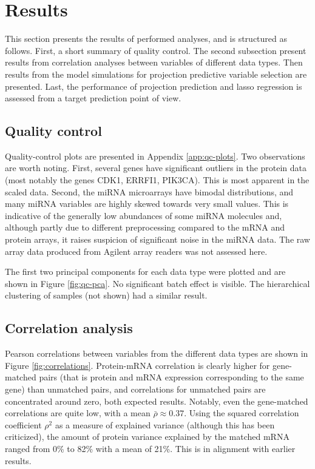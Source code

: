 
\section{Results}

This section presents the results of performed analyses, and is structured as
follows. First, a short summary of quality control. The second subsection
present results from correlation analyses between variables of different data
types. Then results from the model simulations for projection predictive
variable selection are presented. Last, the performance of projection
prediction and lasso regression is assessed from a target prediction point of
view.




\subsection{Quality control}

Quality-control plots are presented in Appendix \ref{app:qc-plots}. Two
observations are worth noting. First, several genes have significant outliers
in the protein data (most notably the genes CDK1, ERRFI1, PIK3CA). This is
most apparent in the scaled data. Second, the miRNA microarrays have bimodal
distributions, and many miRNA variables are highly skewed towards very small
values. This is indicative of the generally low abundances of some miRNA molecules
and, although partly due to different preprocessing compared to the mRNA and
protein arrays, it raises suspicion of significant noise in the miRNA data.
The raw array data produced from Agilent array readers was not assessed here.

The first two principal components for each data type were plotted and are
shown in Figure \ref{fig:qc-pca}. No significant batch effect is visible. The
hierarchical clustering of samples (not shown) had a similar result.




\subsection{Correlation analysis}

Pearson correlations between variables from the different data types are shown in Figure
\ref{fig:correlations}. Protein-mRNA correlation is clearly higher for gene-matched pairs
(that is protein and mRNA expression corresponding to the same gene) than unmatched pairs,
and correlations for unmatched pairs are concentrated around zero, both expected
results. Notably, even the gene-matched correlations are quite low, with a
mean $\bar{\rho} \approx 0.37$. Using the squared correlation coefficient $\rho^2$ as a
measure of explained variance (although this has been criticized), the amount
of protein variance explained by the matched mRNA ranged from 0\% to 82\% with a mean of
21\%. This is in alignment with earlier results. 


